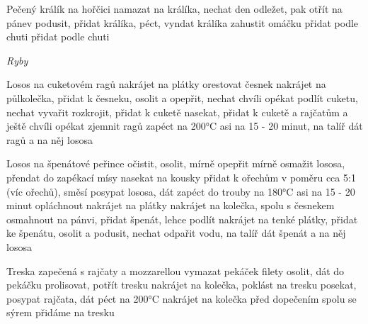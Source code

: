\documentclass[12pt,a4paper]{article}
\begin{document}
\begin{recipe}{Pečený králík na hořčici}
   namazat na králíka, nechat den odležet, pak otřít
   na pánev
   podusit, přidat králíka, péct, vyndat králíka
   zahustit omáčku
   přidat podle chuti
   přidat podle chuti
\end{recipe}
\newpage

\vspace*{\fill}
\hfill {\Huge\it Ryby}\hfill
\vspace*{\fill}
\newpage

\begin{recipe}{Losos na cuketovém ragů}
   nakrájet na plátky
   orestovat česnek
   nakrájet na půlkolečka, přidat k česneku, osolit a opepřit, nechat chvíli opékat
   podlít cuketu, nechat vyvařit
   rozkrojit, přidat k cuketě
   nasekat, přidat k cuketě a rajčatům a ještě chvíli opékat
   zjemnit ragů
   zapéct na 200°C asi na 15 - 20 minut, na talíř dát ragů a na něj lososa
\end{recipe}
\newpage

\begin{recipe}{Losos na špenátové peřince}
   očistit, osolit, mírně opepřit
   mírně osmažit lososa, přendat do zapékací mísy
   nasekat na kousky
   přidat k ořechům v poměru cca 5:1 (víc ořechů), směsí posypat lososa, dát zapéct do trouby na 180°C asi na 15 - 20 minut
   opláchnout
   nakrájet na plátky
   nakrájet na kolečka, spolu s česnekem osmahnout na pánvi, přidat špenát, lehce podlít
   nakrájet na tenké plátky, přidat ke špenátu, osolit a podusit, nechat odpařit vodu, na talíř dát špenát a na něj lososa
\end{recipe}
\newpage

\begin{recipe}{Treska zapečená s rajčaty a mozzarellou}
   vymazat pekáček
   filety osolit, dát do pekáčku
   prolisovat, potřít tresku
   nakrájet na kolečka, poklást na tresku
   posekat, posypat rajčata, dát péct na 200°C
   nakrájet na kolečka
   před dopečením spolu se sýrem přidáme na tresku
\end{recipe}
\newpage
\end{document}
